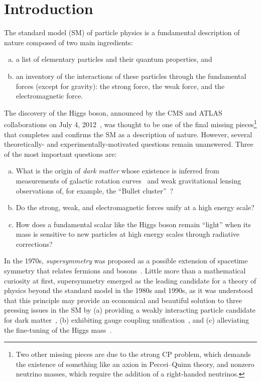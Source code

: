 \chapter{Introduction}
\label{ch:intro}

The standard model (SM) of particle physics is a fundamental description of nature
composed of two main ingredients:
\begin{enumerate}[(a)]
\item a list of elementary particles and their quantum properties, and
\item an inventory of the interactions of these particles through the fundamental forces
(except for gravity): the strong force, the weak force, and the electromagnetic
force. 
\end{enumerate}
The discovery of the Higgs boson, announced by the CMS and ATLAS
collaborations on July 4, 2012~\cite{CMShiggs,ATLAShiggs}, was
thought to be one of the final missing pieces\footnote{Two other missing
  pieces are due to the strong CP problem, which demands the existence of
  something like an axion in Peccei--Quinn theory, and nonzero neutrino masses, which require the addition of a right-handed neutrinos.} that completes and confirms the
SM as a description of nature. However, several theoretically- and
experimentally-motivated questions remain unanswered. Three
of the most important questions are:
\begin{enumerate}[(a)]
\item What is the origin of \emph{dark matter} whose existence is
  inferred from measurements of galactic rotation
  curves~\cite{1980ApJrotationcurves,1989HIrotationcurves} and weak gravitational lensing
  observations of, for example, the ``Bullet cluster''~\cite{Clowe:2006eq}?
\item Do the strong, weak, and electromagnetic
  forces unify at a high energy scale?
\item How does a fundamental scalar like the Higgs boson remain
  ``light'' when its mass is sensitive to new particles at high energy
  scales through radiative corrections?
\end{enumerate}

In the 1970s, \emph{supersymmetry} was proposed as a
possible extension of spacetime symmetry that relates fermions and
bosons~\cite{Ramond,Golfand,Volkov,Wess,Fayet}. Little
more than a mathematical curiosity at first, supersymmetry
emerged as the leading candidate for a theory of physics beyond the
standard model in the 1980s and 1990s, as it was understood that this 
principle may provide an economical and beautiful solution to
three pressing issues in the SM by (a) providing a weakly interacting particle candidate for dark
matter~\cite{Ellis:1983ew,Jungman:1995df}, (b) exhibiting gauge coupling
unification~\cite{Dimopoulos:1981yj,Marciano:1981un,Einhorn:1981sx,Ibanez:1981yh,Amaldi:1991cn,Langacker:1995fk},
and (c) alleviating the fine-tuning of the Higgs mass~\cite{Witten:1981nf,Dimopoulos:1981zb,Dine:1981za,Dimopoulos:1981au,Sakai:1981gr,Kaul:1981hi}.

